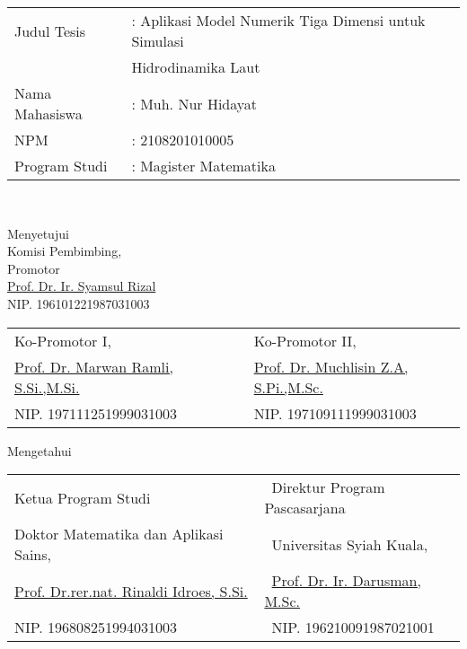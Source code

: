 \setcounter{page}{2}
\vspace{1.5pc}

\begin{center}
	\normalsize
	\noindent
	\begin{tabular}{l l l}
		Judul Tesis \verb"  " &: Aplikasi Model Numerik Tiga Dimensi untuk Simulasi \\
		& \; Hidrodinamika Laut \\
		Nama Mahasiswa &: Muh. Nur Hidayat \\
		NPM &: 2108201010005 \\
		Program Studi	&: Magister Matematika \\ 
	\end{tabular} \\
\end{center}

\begin{center}
	\vspace{3cm}
	Menyetujui\\
	Komisi Pembimbing, \\
	Promotor \\
	\vspace{2cm}
	\underline{Prof. Dr. Ir. Syamsul Rizal} \\
	NIP. 196101221987031003
	\vspace{1cm}
	
	\begin{tabular}{l l }
		Ko-Promotor I,\verb"                       " & Ko-Promotor II, \verb"            "\\[2.25cm]
		\underline{Prof. Dr. Marwan Ramli, S.Si.,M.Si.} & \underline{Prof. Dr. Muchlisin Z.A, S.Pi.,M.Sc.}\\
		NIP. 197111251999031003 & NIP. 197109111999031003
	\end{tabular}
\end{center}

\begin{center}
	\vspace{0.5cm}
	Mengetahui\\%
	
	\vspace{1cm}
	
	\begin{tabular}{l l }
		Ketua Program Studi\verb"                  " & \verb" "Direktur Program Pascasarjana\\
		Doktor Matematika dan Aplikasi Sains, & \verb" "Universitas Syiah Kuala,\\[2.25cm]
		\underline{Prof. Dr.rer.nat. Rinaldi Idroes, S.Si.} & \verb" "\underline{Prof. Dr. Ir. Darusman, M.Sc.}\\
		NIP. 196808251994031003 & \verb" "NIP. 196210091987021001
	\end{tabular}
\end{center}
%	

